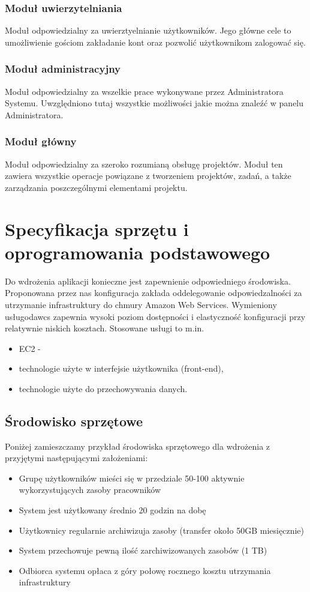 \documentclass[12pt, oneside, final]{report}
\begin{document}
\subsection{Moduł uwierzytelniania}
Moduł odpowiedzialny za uwierztyelnianie użytkowników. Jego główne cele to umożliwienie gościom zakładanie kont oraz pozwolić użytkownikom zalogować się.
\subsection{Moduł administracyjny}
Moduł odpowiedzialny za wszelkie prace wykonywane przez Administratora Systemu. Uwzględniono tutaj wszystkie możliwości jakie można znaleźć w panelu Administratora.
\subsection{Moduł główny}
Moduł odpowiedzialny za szeroko rozumianą obsługę projektów. Moduł ten zawiera wszystkie operacje powiązane z tworzeniem projektów, zadań, a także zarządzania poszczególnymi elementami projektu.

\chapter{Specyfikacja sprzętu i oprogramowania podstawowego}
Do wdrożenia aplikacji konieczne jest zapewnienie odpowiedniego środowiska. Proponowana przez nas konfiguracja zakłada oddelegowanie odpowiedzalności za utrzymanie infrastruktury do chmury Amazon Web Services. Wymieniony usługodawcs zapewnia wysoki poziom dostępności i elastyczność konfiguracji przy relatywnie niskich kosztach. Stosowane usługi to m.in.

\begin{itemize}
	\item EC2 - 
	\item technologie użyte w interfejsie użytkownika (front-end),
	\item technologie użyte do przechowywania danych.
\end{itemize}

\section{Środowisko sprzętowe}
Poniżej zamieszczamy przykład środowiska sprzętowego dla wdrożenia z przyjętymi następującymi założeniami:
\begin{itemize}
\item Grupę użytkowników mieści się w przedziale 50-100 aktywnie wykorzystujących zasoby pracowników
\item System jest użytkowany średnio 20 godzin na dobę
\item Użytkownicy regularnie archiwizuja zasoby (transfer około 50GB miesięcznie)
\item System przechowuje pewną ilość zarchiwizowanych zasobów (1 TB)
\item Odbiorca systemu opłaca z góry połowę rocznego kosztu utrzymania infrastruktury
\end{itemize}
\end{document}
